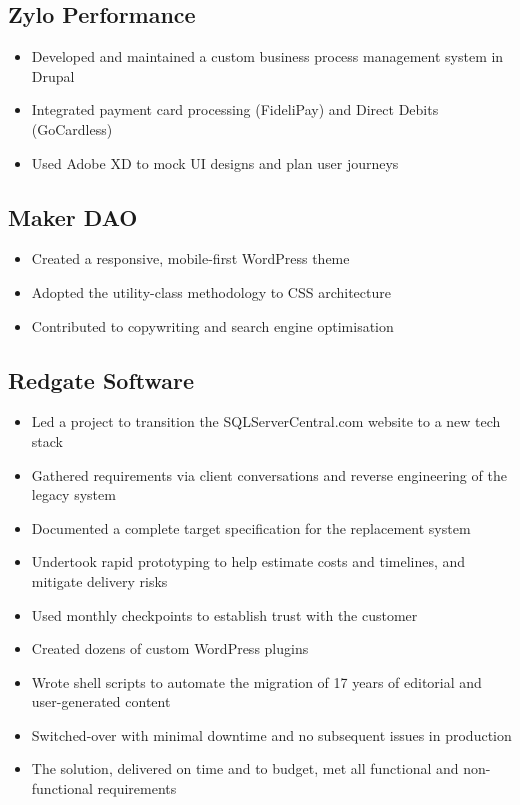 \documentclass[a4paper,10pt]{article}
\begin{document}
\subsection*{Zylo Performance \hfill {}}
\begin{itemize}
  \item Developed and maintained a custom business process management system in Drupal
  \item Integrated payment card processing (FideliPay) and Direct Debits (GoCardless)
  \item Used Adobe XD to mock UI designs and plan user journeys
\end{itemize}

\subsection*{Maker DAO \hfill {}}
\begin{itemize}
  \item Created a responsive, mobile-first WordPress theme
  \item Adopted the utility-class methodology to CSS architecture
  \item Contributed to copywriting and search engine optimisation
\end{itemize}

\subsection*{Redgate Software \hfill {}}
\begin{itemize}
  \item Led a project to transition the SQLServerCentral.com website to a new tech stack
  \item Gathered requirements via client conversations and reverse engineering of the legacy system
  \item Documented a complete target specification for the replacement system
  \item Undertook rapid prototyping to help estimate costs and timelines, and mitigate delivery risks
  \item Used monthly checkpoints to establish trust with the customer
  \item Created dozens of custom WordPress plugins
  \item Wrote shell scripts to automate the migration of 17 years of editorial and user-generated content
  \item Switched-over with minimal downtime and no subsequent issues in production
  \item The solution, delivered on time and to budget, met all functional and non-functional requirements
\end{itemize}
\end{document}
